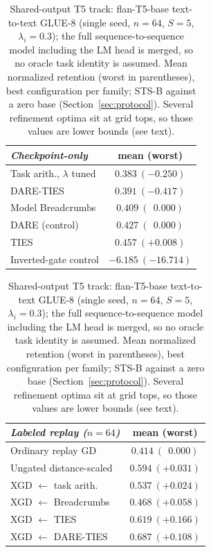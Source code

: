 \documentclass{article} %
\begin{document}
\iffalse
\begin{table}[t]
\centering
\small
\caption{Shared-output T5 track: flan-T5-base text-to-text GLUE-8 (single seed, $n=64$, $S=5$, $\lambda_i=0.3$); the full sequence-to-sequence model including the LM head is merged, so no oracle task identity is assumed. Mean normalized retention (worst in parentheses), best configuration per family; STS-B against a zero base (Section~\ref{sec:protocol}). Several refinement optima sit at grid tops, so those values are lower bounds (see text).}
\label{tab:t5}
\footnotesize
\begin{tabular}{lc}
\toprule
\emph{Checkpoint-only} & mean (worst) \\
\midrule
Task arith., $\lambda$ tuned & $0.383\ (-0.250)$ \\
DARE-TIES                    & $0.391\ (-0.417)$ \\
Model Breadcrumbs            & $0.409\ (\ \ 0.000)$ \\
DARE (control)               & $0.427\ (\ \ 0.000)$ \\
TIES                         & $0.457\ (+0.008)$ \\
Inverted-gate control        & $-6.185\ (-16.714)$ \\
\bottomrule
\end{tabular}\hspace{1.5em}
\begin{tabular}{lc}
\toprule
\emph{Labeled replay ($n=64$)} & mean (worst) \\
\midrule
Ordinary replay GD           & $0.414\ (\ \ 0.000)$ \\
Ungated distance-scaled      & $0.594\ (+0.031)$ \\
XGD $\leftarrow$ task arith. & $0.537\ (+0.024)$ \\
XGD $\leftarrow$ Breadcrumbs & $0.468\ (+0.058)$ \\
XGD $\leftarrow$ TIES        & $0.619\ (+0.166)$ \\
XGD $\leftarrow$ DARE-TIES   & $\mathbf{0.687}\ (+0.108)$ \\
\bottomrule
\end{tabular}
\end{table}
\end{document}
